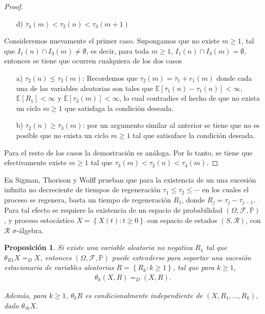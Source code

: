 \documentclass{article}
\newtheorem{Prop}{Proposición}
\newcommand{\esp}{\mathbb{E}}
\newcommand{\prob}{\mathbb{P}}
\begin{document}
\begin{proof}
\begin{itemize}
\item[d)] $\overline{\tau}_{4}\left(m\right)<\tau_{2}\left(n\right)
<\tau_{3}\left(m+1\right)$
\end{itemize}

Consideremos nuevamente el primer caso. Supongamos que no existe $m\geq1$, tal que $I_{1}\left(n\right)\cap I_{3}\left(m\right)\neq\emptyset$, es decir, para toda $m\geq1$, $I_{1}\left(n\right)\cap I_{3}\left(m\right)=\emptyset$, entonces se tiene que ocurren cualquiera de los dos casos

\begin{itemize}
\item[a)] $\tau_{2}\left(n\right)\leq\tau_{3}\left(m\right)$: Recordemos que $\tau_{2}\left(m\right)=\overline{\tau}_{1}+r_{1}\left(m\right)$ donde cada una de las variables aleatorias son tales que $\esp\left[\overline{\tau}_{1}\left(n\right)-\tau_{1}\left(n\right)\right]<\infty$, $\esp\left[R_{1}\right]<\infty$ y $\esp\left[\tau_{3}\left(m\right)\right]<\infty$, lo cual contradice el hecho de que no exista un ciclo $m\geq1$ que satisfaga la condici\'on deseada.

\item[b)] $\tau_{2}\left(n\right)\geq\overline{\tau}_{3}\left(m\right)$: por un argumento similar al anterior se tiene que no es posible que no exista un ciclo $m\geq1$ tal que satisaface la condici\'on deseada.

\end{itemize}

Para el resto de los casos la demostraci\'on es an\'aloga. Por lo tanto, se tiene que efectivamente existe $m\geq1$ tal que $\tau_{3}\left(m\right)<\tau_{2}\left(n\right)<\tau_{4}\left(m\right)$.
\end{proof}
\newpage

En Sigman, Thorison y Wolff \cite{Sigman2} prueban que para la existencia de un una sucesi\'on infinita no decreciente de tiempos de regeneraci\'on $\tau_{1}\leq\tau_{2}\leq\cdots$ en los cuales el proceso se regenera, basta un tiempo de regeneraci\'on $R_{1}$, donde $R_{j}=\tau_{j}-\tau_{j-1}$. Para tal efecto se requiere la existencia de un espacio de probabilidad $\left(\Omega,\mathcal{F},\prob\right)$, y proceso estoc\'astico $\textit{X}=\left\{X\left(t\right):t\geq0\right\}$ con espacio de estados $\left(S,\mathcal{R}\right)$, con $\mathcal{R}$ $\sigma$-\'algebra.

\begin{Prop}
Si existe una variable aleatoria no negativa $R_{1}$ tal que $\theta_{R1}X=_{D}X$, entonces $\left(\Omega,\mathcal{F},\prob\right)$ puede extenderse para soportar una sucesi\'on estacionaria de variables aleatorias $R=\left\{R_{k}:k\geq1\right\}$, tal que para $k\geq1$,
\begin{eqnarray*}
\theta_{k}\left(X,R\right)=_{D}\left(X,R\right).
\end{eqnarray*}

Adem\'as, para $k\geq1$, $\theta_{k}R$ es condicionalmente independiente de $\left(X,R_{1},\ldots,R_{k}\right)$, dado $\theta_{\tau k}X$.

\end{Prop}
\end{document}
